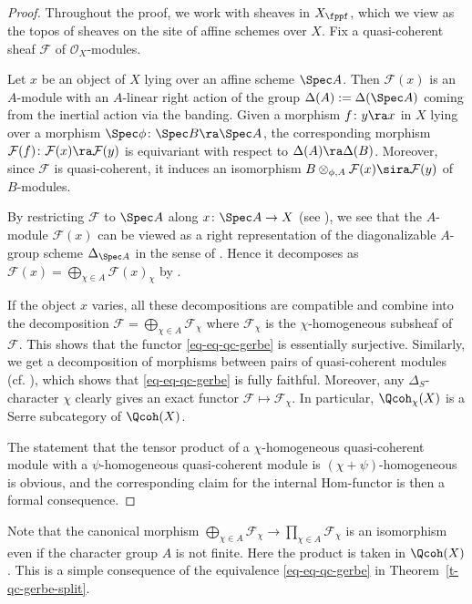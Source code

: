 \begin{proof}
Throughout the proof,
we work with sheaves in $X_\fppf$,
which we view as the topos of sheaves on the site of affine schemes over $X$.
Fix a quasi-coherent sheaf $\mathcal{F}$ of $\mathcal{O}_X$-modules.

  Let $x$ be an object of $X$ lying over an affine scheme $\Spec A$.
  Then $\mathcal{F}(x)$ is an $A$-module with an $A$-linear right action of the group 
  $\Delta(A):=\Delta(\Spec A)$ coming from the inertial action via the banding.
  Given a morphism $f \colon y \ra x$ in $X$ lying over a
  morphism $\Spec \phi \colon \Spec B \ra \Spec A$,
  the corresponding morphism $\mathcal{F}(f) \colon \mathcal{F}(x) \ra \mathcal{F}(y)$ 
  is equivariant with respect to $\Delta(A) \ra \Delta(B)$.
  Moreover, since $\mathcal{F}$ is quasi-coherent,
  it induces an isomorphism $B \otimes_{\phi, A} 
  \mathcal{F}(x) \sira \mathcal{F}(y)$ of $B$-modules.

  By restricting $\mathcal{F}$ to $\Spec A$ along $x\colon \Spec A \to X$ (see \cite[]{stacks-project}),
  we see that the $A$-module $\mathcal{F}(x)$ can be viewed as
  a right representation of the diagonalizable $A$-group scheme
  $\Delta_{\Spec A}$ in the sense of \cite[I.2.7]{Jantzen}.
  Hence it decomposes as 
  $\mathcal{F}(x)=\bigoplus_{\chi \in A}\mathcal{F}(x)_\chi$ by 
  \cite[I.2.11]{Jantzen}.

  If the object $x$ varies, all these decompositions 
  are compatible and combine into the decomposition 
  $\mathcal{F}=\bigoplus_{\chi \in A} \mathcal{F}_\chi$ where
  $\mathcal{F}_\chi$ is the 
  $\chi$-homogeneous subsheaf of $\mathcal{F}$. 
  This shows that the functor \eqref{eq-eq-qc-gerbe} is
  essentially surjective.
  Similarly, we get a decomposition of morphisms between pairs of quasi-coherent modules
  (cf. \cite[I.2.11]{Jantzen}),
  which shows that \eqref{eq-eq-qc-gerbe} is fully faithful.
  Moreover, any $\Delta_S$-character $\chi$ clearly gives an exact functor $\mathcal{F} \mapsto \mathcal{F}_\chi$.
  In particular, $\Qcoh_\chi(X)$ is a Serre subcategory of $\Qcoh(X)$.

  The statement that the tensor product of a $\chi$-homogeneous
  quasi-coherent module with a $\psi$-homogeneous quasi-coherent
  module is $(\chi+\psi)$-homogeneous is obvious, and
  the corresponding claim for the internal Hom-functor is then a
  formal consequence.
\end{proof}

\begin{remark}
\label{rem-coprod-prod}
Note that the canonical morphism
$
\bigoplus_{\chi\in A} \mathcal{F}_\chi
\to
\prod_{\chi\in A} \mathcal{F}_\chi
$
is an isomorphism even if the character group
$A$ is not finite. Here the product is taken in $\Qcoh(X)$.
This is a simple consequence of 
the equivalence 
\eqref{eq-eq-qc-gerbe} in
Theorem~\ref{t-qc-gerbe-split}.
\end{remark}


